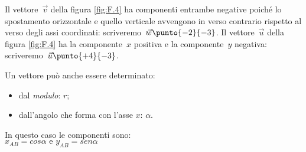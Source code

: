 \begin{esempio}
Il vettore~$\vec{v}$ della figura \ref{fig:F.4} ha componenti entrambe 
negative poiché lo spostamento orizzontale e quello verticale avvengono 
in verso contrario rispetto al verso degli assi coordinati: 
scriveremo~$\vec{w}\punto{-2}{-3}$. 
Il vettore~$\vec{u}$ della figura \ref{fig:F.4} ha la componente~$x$ positiva 
e la componente~$y$ negativa: 
scriveremo~$\vec{u}\punto{+4}{-3}$.
\end{esempio}
% 

\begin{minipage}{.49 \textwidth}
Un vettore può anche essere determinato:
\begin{itemize}
 \item dal \emph{modulo}: \(r\);
 \item dall'angolo che forma con l'asse \(x\): \(\alpha\).
\end{itemize}

In questo caso le componenti sono:\\
\(x_{AB} = cos \alpha \text{ e } y_{AB} = sen \alpha\)  
\end{minipage}
\hfill
\begin{minipage}{.49 \textwidth}
 \begin{inaccessibleblock}
 \begin{center}
  \vettorepolare
 \end{center}
\end{inaccessibleblock}
\end{minipage}


